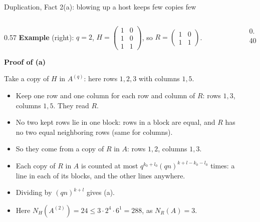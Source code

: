 \documentclass[aspectratio=169,11pt,t]{beamer}
\newcommand{\stephead}[1]{{\color{accent!85!black}\bfseries #1}\par\vspace{0.15em}}
\newenvironment{steplist}{\setlength{\leftmargini}{1.1em}\begin{itemize}\setlength{\itemsep}{0.18em}\setlength{\parskip}{0pt}\setlength{\topsep}{0pt}}{\end{itemize}}
\newcommand{\smallmat}[1]{\left(\begin{smallmatrix}#1\end{smallmatrix}\right)}
\begin{document}
\begin{frame}{Duplication, Fact 2(a): blowing up a host keeps few copies few}
\begin{columns}[T]
\begin{column}{0.57\textwidth}
{\color{accent!85!black}\bfseries Example} (right): $q=2$, $H=\smallmat{1&0\\1&0\\1&1}$, so $R=\smallmat{1&0\\1&1}$.
\begin{overprint}
\raggedright
{}
\raggedright
\stephead{Proof of (a)}
Take a copy of $H$ in $A^{(q)}$: here \textcolor{accent!90!black}{rows $1,2,3$ with columns $1,5$}.
\raggedright
\begin{steplist}
\item Keep one row and one column for each row and column of $R$: \textcolor{teal!80!black}{rows $1,3$, columns $1,5$}. They read $R$.
\item No two kept rows lie in one block: rows in a block are equal, and $R$ has no two equal neighboring rows (same for columns).
\item So they come from a \textcolor{teal!80!black}{copy of $R$ in $A$}: rows $1,2$, columns $1,3$.
\end{steplist}
\raggedright
\begin{steplist}
\item Each copy of $R$ in $A$ is counted at most $q^{k_0+l_0}(qn)^{k+l-k_0-l_0}$ times: a line in each of its blocks, and the other lines anywhere.
\item Dividing by $(qn)^{k+l}$ gives (a).
\item Here $N_H(A^{(2)})=24\le3\cdot2^{4}\cdot6^{1}=288$, as $N_R(A)=3$.
\end{steplist}
\end{overprint}
\end{column}
\begin{column}{0.40\textwidth}
\centering
{}
\end{column}
\end{columns}
\end{frame}
\end{document}
